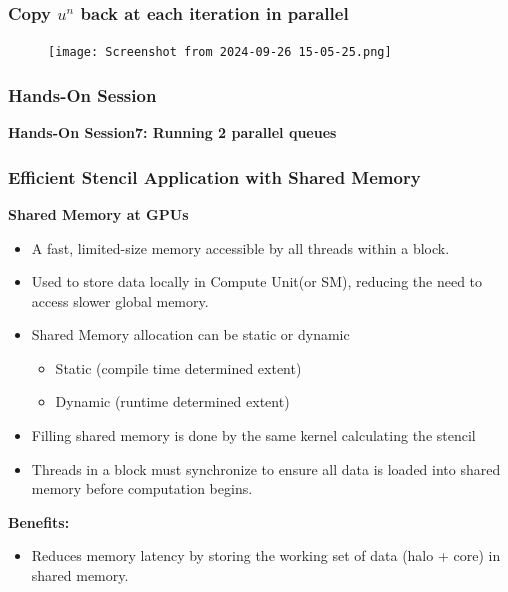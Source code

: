 \documentclass[9pt]{beamer}
\begin{document}
\begin{frame}
\frametitle{Copy $u^{n}$ back at each iteration in parallel}
\begin{figure}
    \centering
    \texttt{[image: Screenshot from 2024-09-26 15-05-25.png]}
    \label{fig:enter-label}
\end{figure}
\end{frame}


\begin{frame}
\frametitle{Hands-On Session}
\begin{center}
      \Huge \textbf{Hands-On Session7: Running 2 parallel queues}
  \end{center}
\end{frame}


\begin{frame}[fragile]
\frametitle{Efficient Stencil Application with Shared Memory}
\textbf{Shared Memory at GPUs}
    \begin{itemize}
        \item A fast, limited-size memory accessible by all threads within a block.
        \item Used to store data locally in Compute Unit(or SM), reducing the need to access slower global memory.
        \item Shared Memory allocation can be static or dynamic
        \begin{itemize}
            \item Static (compile time determined extent)
            \item Dynamic (runtime determined extent)
        \end{itemize}
         \item Filling shared memory is done by the same kernel calculating the stencil
         \item Threads in a block must synchronize to ensure all data is loaded into shared memory before computation begins.
   \end{itemize}
  \textbf{Benefits:}
    \begin{itemize}
        \item Reduces memory latency by storing the working set of data (halo + core) in shared memory.
    \end{itemize}
\end{frame}
\end{document}
